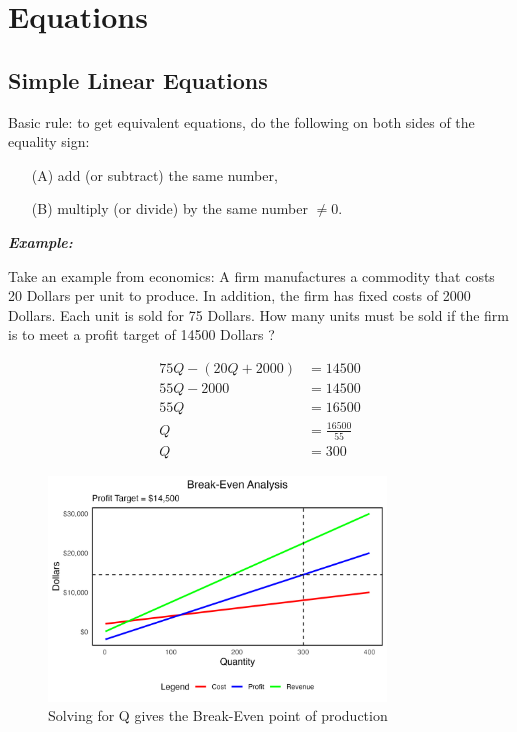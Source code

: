 \documentclass{article}
\begin{document}
\section{Equations}
\subsection{Simple Linear Equations}

Basic rule: to get equivalent equations, do the following on both sides of the equality sign: 
\begin{itemize}
\item[(A)] add (or subtract) the same number,
\item[(B)] multiply (or divide) by the same number $\neq 0$.
\end{itemize}

\textbf{\textit{Example:}}

Take an example from economics: A firm manufactures a commodity that costs 20 Dollars per unit to produce. In addition, the firm has fixed costs of 2000 Dollars. Each unit is sold for 75 Dollars. How many units must be sold if the firm is to meet a profit target of 14500 Dollars ?

\begin{align*}
75Q - (20Q + 2000) &= 14500 \\
55Q - 2000 &= 14500 \\
55Q &= 16500 \\
Q &= \frac{16500}{55} \\
Q &= 300
\end{align*}

\begin{figure}[h]
\centering
\includegraphics[width=0.8\textwidth]{Profit_Break_Even.png}
\caption{Solving for Q gives the Break-Even point of production}
\label{fig:distance_diagram}
\end{figure}
\end{document}
